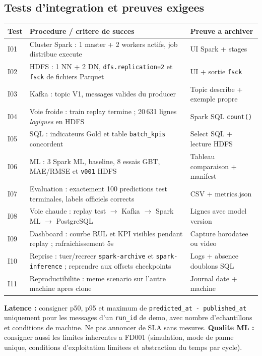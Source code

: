 \documentclass[10pt,a4paper]{article}
\newcommand{\code}[1]{{\small\ttfamily\nolinkurl{#1}}}
\begin{document}
\subsection{Tests d'integration et preuves exigees}
\begin{tabularx}{\linewidth}{@{}p{18mm}Yp{40mm}@{}}
\toprule
\textbf{Test} & \textbf{Procedure / critere de succes} & \textbf{Preuve a archiver}\\\midrule
I01 & Cluster Spark : 1 master + 2 workers actifs, job distribue execute & UI Spark + stages\\
I02 & HDFS : 1 NN + 2 DN, \code{dfs.replication=2} et \code{fsck} de fichiers Parquet & UI + sortie \code{fsck}\\
I03 & Kafka : topic V1, messages valides du producer & Topic describe + exemple propre\\
I04 & Voie froide : train replay termine ; 20\,631 lignes \emph{logiques} en HDFS & Spark SQL \code{count()}\\
I05 & SQL : indicateurs Gold et table \code{batch_kpis} concordent & Select SQL + lecture HDFS\\
I06 & ML : 3 Spark ML, baseline, 8 essais GBT, MAE/RMSE et \code{v001} HDFS & Tableau comparaison + manifest\\
I07 & Evaluation : exactement 100 predictions test terminales, labels officiels corrects & CSV + metrics.json\\
I08 & Voie chaude : replay test \(\rightarrow\) Kafka \(\rightarrow\) Spark ML \(\rightarrow\) PostgreSQL & Lignes avec model version\\
I09 & Dashboard : courbe RUL et KPI visibles pendant replay ; rafraichissement 5s & Capture horodatee ou video\\
I10 & Reprise : tuer/recreer \code{spark-archive} et \code{spark-inference} ; reprendre aux offsets checkpoints & Logs + absence doublons SQL\\
I11 & Reproductibilite : meme scenario sur l'autre machine apres clone & Journal date + machine\\
\bottomrule
\end{tabularx}
\textbf{Latence :} consigner p50, p95 et maximum de \code{predicted_at - published_at} uniquement pour les messages d'un \code{run_id} de demo, avec nombre d'echantillons et conditions de machine. Ne pas annoncer de SLA sans mesures. \textbf{Qualite ML :} consigner aussi les limites inherentes a FD001 (simulation, mode de panne unique, conditions d'exploitation limitees et abstraction du temps par cycle).
\end{document}
